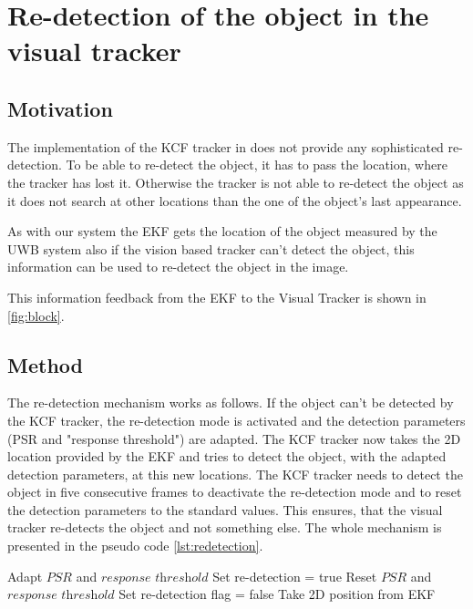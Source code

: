 
\chapter{Re-detection of the object in the visual tracker}\label{ch:redetecton}

\section{Motivation}
The implementation of the \acf{KCF} tracker in \cite{Haag:2015} does not provide any sophisticated re-detection. To be able to re-detect the object, it has to pass the location, where the tracker has lost it. Otherwise the tracker is not able to re-detect the object as it does not search at other locations than the one of the object's last appearance.

As with our system the \acf{EKF} gets the location of the object measured by the \acf{UWB} system also if the vision based tracker can't detect the object, this information can be used to re-detect the object in the image.

This information feedback from the \ac{EKF} to the Visual Tracker is shown in \autoref{fig:block}.

\section{Method}
The re-detection mechanism works as follows. If the object can't be detected by the \ac{KCF} tracker, the re-detection mode is activated and the detection parameters (PSR and "response threshold") are adapted. The \ac{KCF} tracker now takes the 2D location provided by the \ac{EKF} and tries to detect the object, with the adapted detection parameters, at this new locations. The \ac{KCF} tracker needs to detect the object in five consecutive frames to deactivate the re-detection mode and to reset the detection parameters to the standard values. This ensures, that the visual tracker re-detects the object and not something else.
The whole mechanism is presented in the pseudo code \autoref{lst:redetection}.

\begin{algorithm}
	\begin{algorithmic}[1]
				\State Adapt $\textit{PSR}$ and $\textit{response threshold}$
				\State Set re-detection = true
			\Else
					\State Reset $\textit{PSR}$ and $\textit{response threshold}$
					\State Set re-detection flag = false
				\EndIf
			\EndIf
				\State Take 2D position from \ac{EKF}
			\EndIf
		\EndWhile
	\end{algorithmic}
	\label{lst:redetection}
\end{algorithm}

